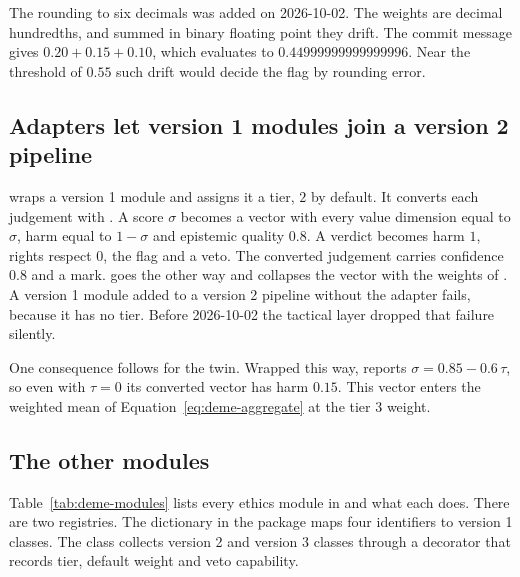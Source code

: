 The rounding to six decimals was added on 2026-10-02. The weights are decimal hundredths, and
summed in binary floating point they drift. The commit message gives $0.20+0.15+0.10$, which
evaluates to $0.44999999999999996$. Near the threshold of $0.55$ such drift would decide the flag
by rounding error.

\subsection{Adapters let version 1 modules join a version 2 pipeline}

 wraps a version 1 module and assigns it a tier, $2$ by default. It converts
each judgement with . A score $\sigma$ becomes a vector with every
value dimension equal to $\sigma$, harm equal to $1-\sigma$ and epistemic quality $0.8$. A
 verdict becomes harm $1$, rights respect $0$, the flag  and a veto.
The converted judgement carries confidence $0.8$ and a  mark.
 goes the other way and collapses the vector with the weights of
. A version 1 module added to a version 2 pipeline without the adapter
fails, because it has no tier. Before 2026-10-02 the tactical layer dropped that failure
silently.

One consequence follows for the twin. Wrapped this way,  reports
$\sigma = 0.85 - 0.6\,\tau$, so even with $\tau = 0$ its converted vector has harm
$0.15$. This vector enters the weighted mean of Equation~\eqref{eq:deme-aggregate} at the tier 3
weight.

\subsection{The other modules}

Table~\ref{tab:deme-modules} lists every ethics module in  and what each
does. There are two registries. The dictionary  in the package
 maps four identifiers to version 1 classes. The class 
collects version 2 and version 3 classes through a decorator that records tier, default weight
and veto capability.

